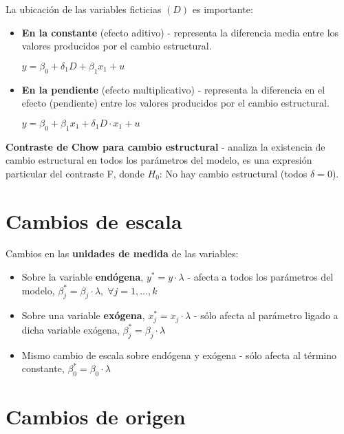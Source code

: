 \documentclass[10pt, a4paper, landscape]{article}
\begin{document}
\begin{multicols}{3}
La ubicación de las variables ficticias \( (D) \) es importante:

\begin{itemize}[leftmargin=*]
	\item \textbf{En la constante} (efecto aditivo) - representa la diferencia media entre los valores producidos por el cambio estructural.
	\begin{center}
		\( y = \beta_{0} + \delta_{1} D + \beta_{1} x_{1} + u \)
	\end{center}
	\item \textbf{En la pendiente} (efecto multiplicativo) - representa la diferencia en el efecto (pendiente) entre los valores producidos por el cambio estructural.
	\begin{center}
		\( y = \beta_{0} + \beta_{1} x_{1} + \delta_{1} D \cdot x_{1} + u \)
	\end{center}
\end{itemize}

\textbf{Contraste de Chow para cambio estructural} - analiza la existencia de cambio estructural en todos los parámetros del modelo, es una expresión particular del contraste F, donde \( H_{0} \): No hay cambio estructural (todos \( \delta = 0 \)).

\section*{Cambios de escala}

Cambios en las \textbf{unidades de medida} de las variables:

\begin{itemize}[leftmargin=*]
	\item Sobre la variable \textbf{endógena}, \( y^{*} = y \cdot \lambda \) - afecta a todos los parámetros del modelo, \( \beta_{j}^{*} = \beta_{j} \cdot \lambda, \; \forall j = 1, \ldots, k \)
	\item Sobre una variable \textbf{exógena}, \( x_{j}^{*} = x_{j} \cdot \lambda \) - sólo afecta al parámetro ligado a dicha variable exógena, \( \beta_{j}^{*} = \beta_{j} \cdot \lambda \)
	\item Mismo cambio de escala sobre endógena y exógena - sólo afecta al término constante, \( \beta_{0}^{*} = \beta_{0} \cdot \lambda \)
\end{itemize}

\section*{Cambios de origen}


\end{multicols}
\end{document}
